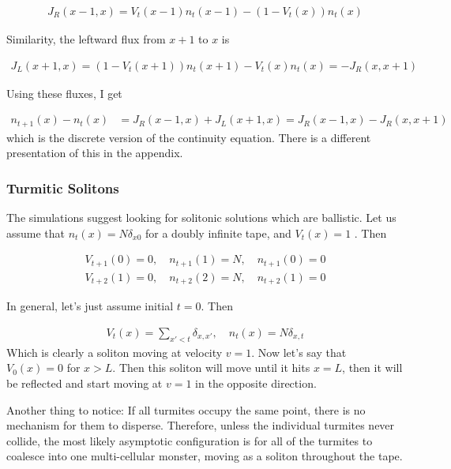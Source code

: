 \documentclass{article}
\begin{document}
\begin{align}
J_{R}(x-1, x) = V_{t}(x-1) n_{t}(x-1) - (1 - V_{t}(x)) n_{t}(x)
\end{align}

Similarity, the leftward flux from $x+1$ to $x$ is

\begin{align}
J_{L}(x+1, x) = (1 - V_{t}(x+1)) n_{t}(x+1) - V_{t}(x) n_{t}(x) = - J_{R}(x, x+1)
\end{align}

Using these fluxes, I get

\begin{align}
n_{t+1}(x) - n_{t}(x)  & = J_{R}(x-1, x) + J_{L}(x+1, x) = J_{R}(x-1, x) - J_{R}(x, x+1)
\end{align}
 which is the discrete version of the continuity equation. There is a different presentation of this in the appendix. 
 
 
\subsubsection{Turmitic Solitons}

The simulations suggest looking for solitonic solutions which are ballistic. Let us assume that $n_{t}(x) = N \delta_{x 0}$ for a doubly infinite tape, and $V_{t}(x) = 1$ . Then

\begin{align}
V_{t+1}(0) = 0, \quad n_{t+1}(1) = N, \quad n_{t+1}(0) = 0\\
V_{t+2}(1) = 0, \quad n_{t+2}(2) = N, \quad n_{t+2}(1) = 0
\end{align}
 
 In general, let's just assume initial $t = 0$. Then
 
 \begin{align}
 V_{t}(x) = \sum_{x' < t} \delta_{x, x'}, \quad n_{t}(x) = N\delta_{x, t}
 \end{align}
 Which is clearly a soliton moving at velocity $v = 1$. Now let's say that $V_{0}(x) = 0$ for $x > L$. Then this soliton will move until it hits $x = L$, then it will be reflected and start moving at $v = 1$ in the opposite direction. 
 
 Another thing to notice: If all turmites occupy the same point, there is no mechanism for them to disperse. Therefore, unless the individual turmites never collide, the most likely asymptotic configuration is for all of the turmites to coalesce into one multi-cellular monster, moving as a soliton throughout the tape. 
\end{document}
